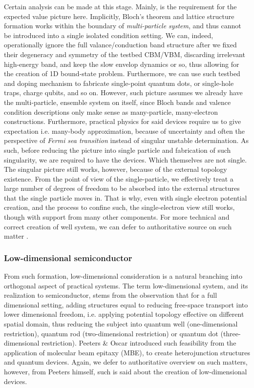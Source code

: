 Certain analysis can be made at this stage. Mainly, is the requirement for the expected value picture here. Implicitly, Bloch's theorem and lattice structure formation works within the boundary of \textit{multi-particle system}, and thus cannot be introduced into a single isolated condition setting. We can, indeed, operationally ignore the full valance/conduction band structure after we fixed their degeneracy and symmetry of the testbed CBM/VBM, discarding irrelevant high-energy band, and keep the slow envelop dynamics or so, thus allowing for the creation of 1D bound-state problem. Furthermore, we can use such testbed and doping mechanism to fabricate single-point quantum dots, or single-hole traps, charge qubits, and so on. However, such picture assumes we already have the multi-particle, ensemble system on itself, since Bloch bands and valence condition descriptions only make sense as many-particle, many-electron constructions. Furthermore, practical physics for said devices require us to give expectation i.e. many-body approximation, because of uncertainty and often the perspective of \textit{Fermi sea transition} instead of singular unstable determination. As such, before reducing the picture into single particle and fabrication of such singularity, we are required to have the devices. Which themselves are not single. The singular picture still works, however, because of the external topology existence. From the point of view of the single-particle, we effectively treat a large number of degrees of freedom to be absorbed into the external structures that the single particle moves in. That is why, even with single electron potential creation, and the process to confine such, the single-electron view still works, though with support from many other components. For more technical and correct creation of well system, we can defer to authoritative source on such matter \cite{David2020OpticalPO,davies1998}. 

\subsubsection{Low-dimensional semiconductor}

From such formation, low-dimensional consideration is a natural branching into orthogonal aspect of practical systems. The term low-dimensional system, and its realization to semiconductor, stems from the observation that for a full dimensional setting, adding structures equal to reducing free-space transport into lower dimensional freedom, i.e. applying potential topology effective on different spatial domain, thus reducing the subject into quantum well (one-dimensional restriction), quantum rod (two-dimensional restriction) or quantum dot (three-dimensional restriction). Peeters \& Oscar \cite{Peeters1992LowDS} introduced such feasibility from the application of molecular beam epitaxy (MBE), to create heterojunction structures and quantum devices. Again, we defer to authoritative overview on such matters, however, from Peeters himself, such is said about the creation of low-dimensional devices. 


